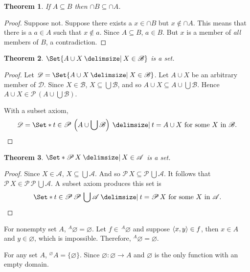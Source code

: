 \documentclass[12pt]{article}
\theoremstyle{plain}
\newtheorem{thm}{Theorem}[section]
\theoremstyle{remark}
\theoremstyle{definition}
\theoremstyle{remark}
\newcommand{\powerset}{\mathscr{P}\,}
\providecommand\st{}
\newcommand\SetSymbol[1][]{%
  \nonscript\:#1\vert%
  \allowbreak%
  \nonscript\:
\mathopen{}}
\DeclarePairedDelimiter{\ang}{\langle}{\rangle}
\renewcommand\st{\SetSymbol[\delimsize]}
\begin{document}
\begin{thm}
  If $A \subseteq B$ then $\cap B \subseteq \cap A$.
\end{thm}
\begin{proof}
  Suppose not. Suppose there exists a $x \in \cap B$ but $x \not\in \cap A$. This means that there is a $a \in A$ such that $x \not\in a$. Since $A \subseteq B$, $a \in B$. But $x$ is a member of \textit{all} members of $B$, a contradiction.
\end{proof}

\begin{thm}
  $\Set{A \cup X \st X \in \mathscr{B}}$ is a set.
\end{thm}
\begin{proof}
  Let $\mathscr{D} = \Set{A \cup X \st X \in \mathscr{B}}$. Let $A \cup X$ be an arbitrary member of $\mathscr{D}$. Since $X \in \mathscr{B}$, $X \subseteq \bigcup \mathscr{B}$, and so $A \cup X \subseteq A \cup \bigcup \mathscr{B}$. Hence $A \cup X \in \powerset\left(A \cup \bigcup  \mathscr{B}\right)$.

  With a subset axiom,
  \[
    \mathscr{D} = \Set*{t \in \powerset\left(A \cup \bigcup  \mathscr{B}\right) \st t = A \cup X \ \text{for some $X$ in $\mathscr{B}$}}.
  \]
\end{proof}

\begin{thm}
  $\Set*{\powerset X \st X \in \mathscr{A}}$ is a set.
\end{thm}
\begin{proof}
  Since $X \in \mathscr{A}$, $X \subseteq \bigcup  \mathscr{A}$. And so $\powerset X \subseteq \powerset \bigcup  \mathscr{A}$. It follows that $\powerset X \in \powerset \powerset \bigcup  \mathscr{A}$. A subset axiom produces this set is
  \[
    \Set*{t \in \powerset \powerset \bigcup  \mathscr{A} \st t = \powerset X\ \text{for some $X$ in $\mathscr{A}$}}.
  \]
\end{proof}

\begin{thmproof}{}
  {For nonempty set $A$, $^{A} \varnothing = \varnothing$.}
  {Let $f \in\, ^{A} \varnothing$ and suppose $\ang{x, y} \in f$, then $x \in A$ and $y \in \varnothing$, which is impossible. Therefore, $^{A} \varnothing = \varnothing$.}
\end{thmproof}

\begin{thmproof}{}
  {For any set $A$, $^{\varnothing} A = \{\varnothing\}$.}
  {Since $\varnothing : \varnothing \rightarrow A$ and $\varnothing$ is the only function with an empty domain.}
\end{thmproof}
\end{document}
